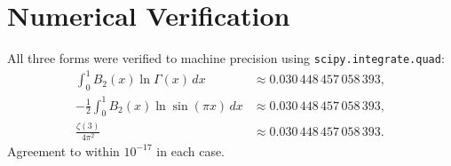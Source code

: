 \documentclass{article}
\begin{document}
\section{Numerical Verification}

All three forms were verified to machine precision using \texttt{scipy.integrate.quad}:
\begin{align*}
  \int_0^1 B_2(x)\ln\Gamma(x)\,dx &\approx 0.030\,448\,457\,058\,393,\\
  -\tfrac{1}{2}\int_0^1 B_2(x)\ln\sin(\pi x)\,dx &\approx 0.030\,448\,457\,058\,393,\\
  \frac{\zeta(3)}{4\pi^2} &\approx 0.030\,448\,457\,058\,393.
\end{align*}
Agreement to within $10^{-17}$ in each case.
\end{document}
